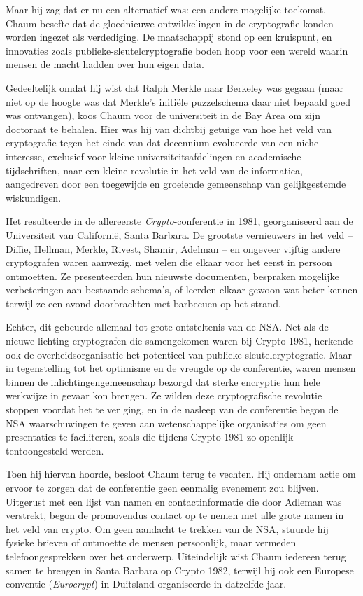 \documentclass[
  a5paper,
  smalldemyvopaper,11pt,twoside,onecolumn,openright,extrafontsizes,
hidelinks]{memoir}
\begin{document}
Maar hij zag dat er nu een alternatief was: een andere mogelijke
toekomst. Chaum besefte dat de gloednieuwe ontwikkelingen in de
cryptografie konden worden ingezet als verdediging. De maatschappij
stond op een kruispunt, en innovaties zoals publieke-sleutelcryptografie
boden hoop voor een wereld waarin mensen de macht hadden over hun eigen
data.

Gedeeltelijk omdat hij wist dat Ralph Merkle naar Berkeley was gegaan
(maar niet op de hoogte was dat Merkle's initiële puzzelschema daar niet
bepaald goed was ontvangen), koos Chaum voor de universiteit in de Bay
Area om zijn doctoraat te behalen. Hier was hij van dichtbij getuige van
hoe het veld van cryptografie tegen het einde van dat decennium
evolueerde van een niche interesse, exclusief voor kleine
universiteitsafdelingen en academische tijdschriften, naar een kleine
revolutie in het veld van de informatica, aangedreven door een
toegewijde en groeiende gemeenschap van gelijkgestemde wiskundigen.

Het resulteerde in de allereerste \emph{Crypto}-conferentie in 1981,
georganiseerd aan de Universiteit van Californië, Santa Barbara. De
grootste vernieuwers in het veld -- Diffie, Hellman, Merkle, Rivest,
Shamir, Adelman -- en ongeveer vijftig andere cryptografen waren
aanwezig, met velen die elkaar voor het eerst in persoon ontmoetten. Ze
presenteerden hun nieuwste documenten, bespraken mogelijke verbeteringen
aan bestaande schema's, of leerden elkaar gewoon wat beter kennen
terwijl ze een avond doorbrachten met barbecuen op het strand.

Echter, dit gebeurde allemaal tot grote ontsteltenis van de NSA. Net als
de nieuwe lichting cryptografen die samengekomen waren bij Crypto 1981,
herkende ook de overheidsorganisatie het potentieel van
publieke-sleutelcryptografie. Maar in tegenstelling tot het optimisme en
de vreugde op de conferentie, waren mensen binnen de
inlichtingengemeenschap bezorgd dat sterke encryptie hun hele werkwijze
in gevaar kon brengen. Ze wilden deze cryptografische revolutie stoppen
voordat het te ver ging, en in de nasleep van de conferentie begon de
NSA waarschuwingen te geven aan wetenschappelijke organisaties om geen
presentaties te faciliteren, zoals die tijdens Crypto 1981 zo openlijk
tentoongesteld werden.

Toen hij hiervan hoorde, besloot Chaum terug te vechten. Hij ondernam
actie om ervoor te zorgen dat de conferentie geen eenmalig evenement zou
blijven. Uitgerust met een lijst van namen en contactinformatie die door
Adleman was verstrekt, begon de promovendus contact op te nemen met alle
grote namen in het veld van crypto. Om geen aandacht te trekken van de
NSA, stuurde hij fysieke brieven of ontmoette de mensen persoonlijk,
maar vermeden telefoongesprekken over het onderwerp. Uiteindelijk wist
Chaum iedereen terug samen te brengen in Santa Barbara op Crypto 1982,
terwijl hij ook een Europese conventie (\emph{Eurocrypt}) in Duitsland
organiseerde in datzelfde jaar.
\end{document}
